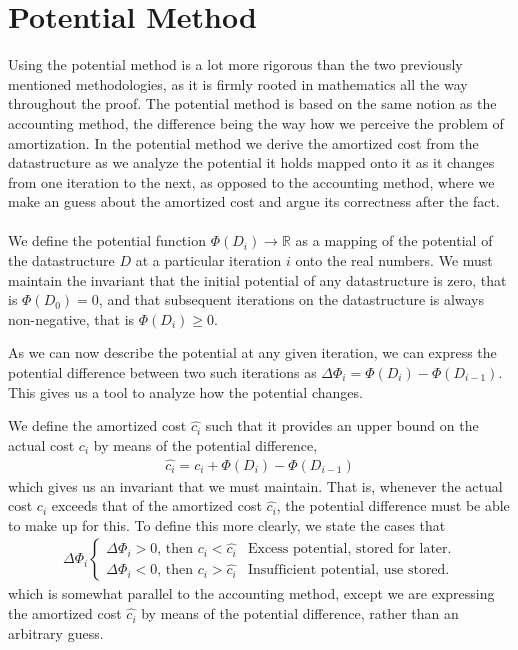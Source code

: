 \section{Potential Method}
Using the potential method is a lot more rigorous than the two previously
mentioned methodologies, as it is firmly rooted in mathematics all the way
throughout the proof. The potential method is based on the same notion as the
accounting method, the difference being the way how we perceive the problem of
amortization. In the potential method we derive the amortized cost from the
datastructure as we analyze the potential it holds mapped onto it as it
changes from one iteration to the next, as opposed to the accounting method,
where we make an guess about the amortized cost and argue its correctness
after the fact.
\\\\
We define the potential function $\Phi(D_i) \rightarrow \mathbb{R}$ as a
mapping of the potential of the datastructure $D$ at a particular iteration
$i$ onto the real numbers. We must maintain the invariant that the initial
potential of any datastructure is zero, that is $\Phi(D_0) = 0$, and that
subsequent iterations on the datastructure is always non-negative, that is
$\Phi(D_i) \geq 0$.

As we can now describe the potential at any given iteration, we can express
the potential difference between two such iterations as $\Delta\Phi_i =
\Phi(D_i) - \Phi(D_{i-1})$. This gives us a tool to analyze how the
potential changes.

We define the amortized cost $\hat{c_i}$ such that it provides an upper bound
on the actual cost $c_i$ by means of the potential difference,
\begin{align}
	\hat{c_i} = c_i + \Phi(D_i) - \Phi(D_{i-1})
\end{align}
which gives us an invariant that we must maintain. That is, whenever the
actual cost $c_i$ exceeds that of the amortized cost $\hat{c_i}$, the
potential difference must be able to make up for this. To define this more
clearly, we state the cases that
\begin{align}
	\Delta\Phi_i
	\begin{cases}
		\Delta\Phi_i > 0 \text{, then }c_i < \hat{c_i} &
		\text{Excess potential, stored for later.} \\
		\Delta\Phi_i < 0 \text{, then }c_i > \hat{c_i} &
		\text{Insufficient potential, use stored.}
	\end{cases}	
\end{align}
which is somewhat parallel to the accounting method, except we are expressing
the amortized cost $\hat{c_i}$ by means of the potential difference, rather
than an arbitrary guess.

